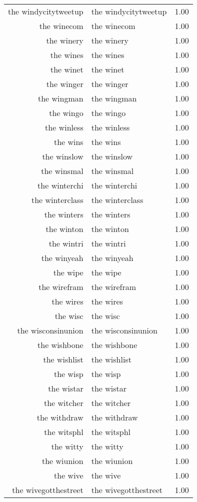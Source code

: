 \begin{table}[ht]
\begin{tabular}{rlr}
  the windycitytweetup & the windycitytweetup & 1.00 \\ 
  the winecom & the winecom & 1.00 \\ 
  the winery & the winery & 1.00 \\ 
  the wines & the wines & 1.00 \\ 
  the winet & the winet & 1.00 \\ 
  the winger & the winger & 1.00 \\ 
  the wingman & the wingman & 1.00 \\ 
  the wingo & the wingo & 1.00 \\ 
  the winless & the winless & 1.00 \\ 
  the wins & the wins & 1.00 \\ 
  the winslow & the winslow & 1.00 \\ 
  the winsmal & the winsmal & 1.00 \\ 
  the winterchi & the winterchi & 1.00 \\ 
  the winterclass & the winterclass & 1.00 \\ 
  the winters & the winters & 1.00 \\ 
  the winton & the winton & 1.00 \\ 
  the wintri & the wintri & 1.00 \\ 
  the winyeah & the winyeah & 1.00 \\ 
  the wipe & the wipe & 1.00 \\ 
  the wirefram & the wirefram & 1.00 \\ 
  the wires & the wires & 1.00 \\ 
  the wisc & the wisc & 1.00 \\ 
  the wisconsinunion & the wisconsinunion & 1.00 \\ 
  the wishbone & the wishbone & 1.00 \\ 
  the wishlist & the wishlist & 1.00 \\ 
  the wisp & the wisp & 1.00 \\ 
  the wistar & the wistar & 1.00 \\ 
  the witcher & the witcher & 1.00 \\ 
  the withdraw & the withdraw & 1.00 \\ 
  the witsphl & the witsphl & 1.00 \\ 
  the witty & the witty & 1.00 \\ 
  the wiunion & the wiunion & 1.00 \\ 
  the wive & the wive & 1.00 \\ 
  the wivegotthestreet & the wivegotthestreet & 1.00 \\ 

\end{tabular}
\end{table}
